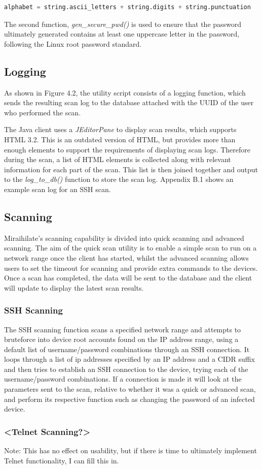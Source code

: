 \begin{lstlisting}[language=Python, caption=Password Alphabet]
alphabet = string.ascii_letters + string.digits + string.punctuation
\end{lstlisting}

The second function, \textit{gen\_secure\_pwd()} is used to ensure that the password ultimately generated contains at least one uppercase letter in the password, following the Linux root password standard.

\subsection{Logging}

As shown in Figure 4.2, the utility script consists of a logging function, which sends the resulting scan log to the database attached with the UUID of the user who performed the scan.

\vspace{0.5cm}

The Java client uses a \textit{JEditorPane} to display scan results, which supports HTML 3.2. This is an outdated version of HTML, but provides more than enough elements to support the requirements of displaying scan logs. Therefore during the scan, a list of HTML elements is collected along with relevant information for each part of the scan. This list is then joined together and output to the \textit{log\_to\_db()} function to store the scan log. Appendix B.1 shows an example scan log for an SSH scan.

\subsection{Scanning}

Miraihilate's scanning capability is divided into quick scanning and advanced scanning. The aim of the quick scan utility is to enable a simple scan to run on a network range once the client has started, whilst the advanced scanning allows users to set the timeout for scanning and provide extra commands to the devices. Once a scan has completed, the data will be sent to the database and the client will update to display the latest scan results.

\subsubsection{SSH Scanning}

The SSH scanning function scans a specified network range and attempts to bruteforce into device root accounts found on the IP address range, using a default list of username/password combinations through an SSH connection. It loops through a list of ip addresses specified by an IP address and a CIDR suffix and then tries to establish an SSH connection to the device, trying each of the username/password combinations. If a connection is made it will look at the parameters sent to the scan, relative to whether it was a quick or advanced scan, and perform its respective function such as changing the password of an infected device.

\subsubsection{<Telnet Scanning?>}

Note: This has no effect on usability, but if there is time to ultimately implement Telnet functionality, I can fill this in.
